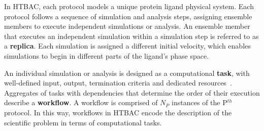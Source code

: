 In HTBAC, each protocol models a unique protein ligand physical system. Each
protocol follows a sequence of simulation and analysis steps, assigning
ensemble members to execute independent simulations or analysis. An ensemble
member that executes an independent simulation within a simulation step is
referred to as a \textbf{replica}. Each simulation is assigned a different
initial velocity, which enables simulations to begin in different parts of
the ligand's phase space.

An individual simulation or analysis is designed as a computational
\textbf{task}, with well-defined input, output, termination criteria and
dedicated resources~\cite{power-of-many17}. Aggregates of tasks with
dependencies that determine the order of their execution describe a
\textbf{workflow}. A workflow is comprised of $N_P$ instances of the P$^{th}$
protocol. In this way, workflows in HTBAC encode the description of the
scientific problem in terms of computational tasks.









